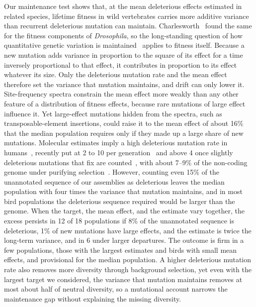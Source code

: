 \documentclass{article}
\begin{document}
Our maintenance test shows that, at the mean deleterious effects estimated in related species, lifetime fitness in wild vertebrates carries more additive variance than recurrent deleterious mutation can maintain. Charlesworth~\cite{charlesworth2015} found the same for the fitness components of \textit{Drosophila}, so the long-standing question of how quantitative genetic variation is maintained~\cite{johnson2005} applies to fitness itself. Because a new mutation adds variance in proportion to the square of its effect for a time inversely proportional to that effect, it contributes in proportion to its effect whatever its size. Only the deleterious mutation rate and the mean effect therefore set the variance that mutation maintains, and drift can only lower it. Site-frequency spectra constrain the mean effect more weakly than any other feature of a distribution of fitness effects, because rare mutations of large effect influence it. Yet large-effect mutations hidden from the spectra, such as transposable-element insertions, could raise it to the mean effect of about 16\% that the median population requires only if they made up a large share of new mutations. Molecular estimates imply a high deleterious mutation rate in humans~\cite{kondrashov1993}, recently put at 2 to 10 per generation~\cite{matheson2023} and above 4 once slightly deleterious mutations that fix are counted~\cite{hernandez2026}, with about 7--9\% of the non-coding genome under purifying selection~\cite{di2025}. However, counting even 15\% of the unannotated sequence of our assemblies as deleterious leaves the median population with four times the variance that mutation maintains, and in most bird populations the deleterious sequence required would be larger than the genome. When the target, the mean effect, and the estimate vary together, the excess persists in 12 of 18 populations if 8\% of the unannotated sequence is deleterious, 1\% of new mutations have large effects, and the estimate is twice the long-term variance, and in 6 under larger departures. The outcome is firm in a few populations, those with the largest estimates and birds with small mean effects, and provisional for the median population. A higher deleterious mutation rate also removes more diversity through background selection, yet even with the largest target we considered, the variance that mutation maintains removes at most about half of neutral diversity, so a mutational account narrows the maintenance gap without explaining the missing diversity.
\end{document}
